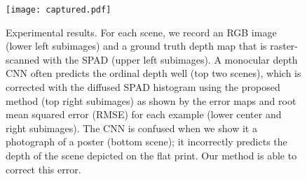 \begin{figure}[t]
	\centering
	\texttt{[image: captured.pdf]}
	\caption{Experimental results. For each scene, we record an RGB image (lower left subimages) and a ground truth depth map that is raster-scanned with the SPAD (upper left subimages). A monocular depth CNN often predicts the ordinal depth well (top two scenes), which is corrected with the diffused SPAD histogram using the proposed method (top right subimages) as shown by the error maps and root mean squared error (RMSE) for each example (lower center and right subimages). The CNN is confused when we show it a photograph of a poster (bottom scene); it incorrectly predicts the depth of the scene depicted on the flat print. Our method is able to correct this error. }
	\label{fig:results_captured}
\end{figure}
